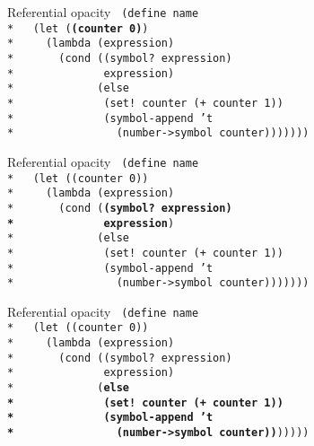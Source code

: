 \begin{frame}{Referential opacity}
  \texttt{
    (define name \\*
    \ \ (let (\textbf{(counter 0)}) \\*
    \ \ \ \ (lambda (expression)\\*
    \ \ \ \ \ \ (cond ((symbol? expression)\\*
    \ \ \ \ \ \ \ \ \ \ \ \ \ expression)\\*
    \ \ \ \ \ \ \ \ \ \ \ \ (else\\*
    \ \ \ \ \ \ \ \ \ \ \ \ \ (set! counter (+ counter 1))\\*
    \ \ \ \ \ \ \ \ \ \ \ \ \ (symbol-append 't\\*
    \ \ \ \ \ \ \ \ \ \ \ \ \ \ \ (number->symbol counter)))))))
  }
\end{frame}

\begin{frame}{Referential opacity}
  \texttt{
    (define name \\*
    \ \ (let ((counter 0)) \\*
    \ \ \ \ (lambda (expression)\\*
    \ \ \ \ \ \ (cond (\textbf{(symbol? expression)\\*
    \ \ \ \ \ \ \ \ \ \ \ \ \ expression})\\*
    \ \ \ \ \ \ \ \ \ \ \ \ (else\\*
    \ \ \ \ \ \ \ \ \ \ \ \ \ (set! counter (+ counter 1))\\*
    \ \ \ \ \ \ \ \ \ \ \ \ \ (symbol-append 't\\*
    \ \ \ \ \ \ \ \ \ \ \ \ \ \ \ (number->symbol counter)))))))
  }
\end{frame}

\begin{frame}{Referential opacity}
  \texttt{
    (define name \\*
    \ \ (let ((counter 0)) \\*
    \ \ \ \ (lambda (expression)\\*
    \ \ \ \ \ \ (cond ((symbol? expression)\\*
    \ \ \ \ \ \ \ \ \ \ \ \ \ expression)\\*
    \ \ \ \ \ \ \ \ \ \ \ \ (\textbf{else\\*
    \ \ \ \ \ \ \ \ \ \ \ \ \ (set! counter (+ counter 1))\\*
    \ \ \ \ \ \ \ \ \ \ \ \ \ (symbol-append 't\\*
    \ \ \ \ \ \ \ \ \ \ \ \ \ \ \ (number->symbol counter))})))))
  }
\end{frame}

